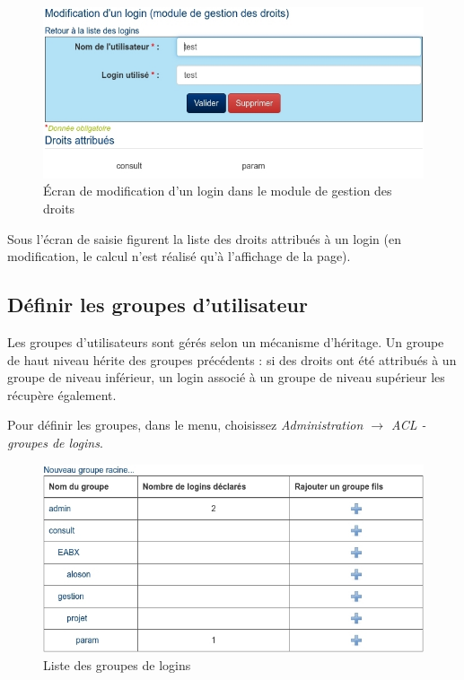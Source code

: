 \begin{figure}[H]
\includegraphics[width=\linewidth]{images/acl_login}
\caption{Écran de modification d'un login dans le module de gestion des droits}
\end{figure}


Sous l'écran de saisie figurent la liste des droits attribués à un login (en modification, le calcul n'est réalisé qu'à l'affichage de la page).

\subsection{Définir les groupes d'utilisateur}

Les groupes d'utilisateurs sont gérés selon un mécanisme d'héritage. Un groupe de haut niveau hérite des groupes précédents : si des droits ont été attribués à un groupe de niveau inférieur, un login associé à un groupe de niveau supérieur les récupère également.

Pour définir les groupes, dans le menu, choisissez \textit{Administration $\rightarrow$ ACL - groupes de logins}.

\begin{figure}[H]
\includegraphics[width=\linewidth]{images/acl_groupe}
\caption{Liste des groupes de logins}
\end{figure}

